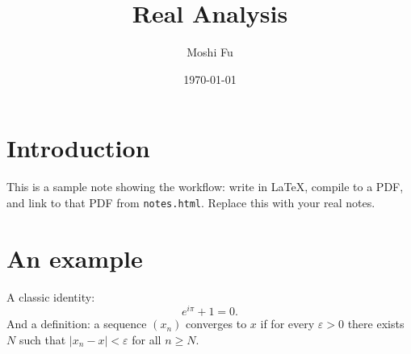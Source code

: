 \documentclass[11pt]{article}
\title{Real Analysis}
\author{Moshi Fu}
\date{\today}
\begin{document}
\maketitle

\section{Introduction}
This is a sample note showing the workflow: write in LaTeX, compile to a PDF,
and link to that PDF from \texttt{notes.html}. Replace this with your real
notes.

\section{An example}
A classic identity:
\[
  e^{i\pi} + 1 = 0.
\]
And a definition: a sequence $(x_n)$ converges to $x$ if for every
$\varepsilon > 0$ there exists $N$ such that $|x_n - x| < \varepsilon$ for all
$n \ge N$.
\end{document}
